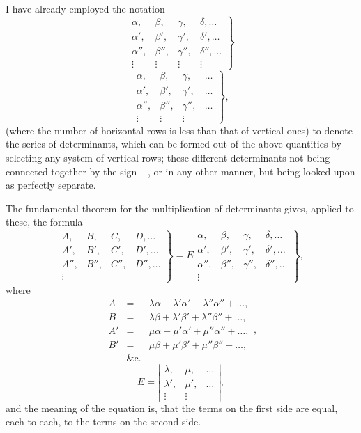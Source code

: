 \documentclass[11pt,a4paper]{article}
\theoremstyle{plain}
\theoremstyle{definition}
\theoremstyle{remark}
\begin{document}
\newpage

I have already employed the notation
\[
\left.
\begin{array}{cccc}
\alpha,&\beta,&\gamma,&\delta,\ldots \\
\alpha',&\beta',&\gamma',&\delta',\ldots \\
\alpha'',&\beta'',&\gamma'',&\delta'',\ldots \\
\vdots&\vdots&\vdots&\vdots
\end{array}
\right\}
\tag{1}
\]
\[
\left.
\begin{array}{cccc}
\alpha,&\beta,&\gamma,&\ldots \\
\alpha',&\beta',&\gamma',&\ldots \\
\alpha'',&\beta'',&\gamma'',&\ldots \\
\vdots&\vdots&\vdots
\end{array}
\right\}
\tag{2},
\]
(where the number of horizontal rows is less than that of vertical ones) to denote
the series of determinants, which can be formed out of the above quantities by selecting any system of vertical
rows; these different determinants not being connected together by the sign $+$, or in
any other manner, but being looked upon as perfectly separate.

The fundamental theorem for the multiplication of determinants gives, applied to
these, the formula
\[
\left.
\begin{array}{cccc}
A,&B,&C,&D,\ldots \\
A',&B',&C',&D',\ldots \\
A'',&B'',&C'',&D'',\ldots \\
\vdots
\end{array}
\right\}
= E
\left.
\begin{array}{cccc}
\alpha,&\beta,&\gamma,&\delta,\ldots \\
\alpha',&\beta',&\gamma',&\delta',\ldots \\
\alpha'',&\beta'',&\gamma'',&\delta'',\ldots \\
\vdots
\end{array}
\right\}
\tag{3},
\]
where
\[
\begin{array}{rcl}
A &=& \lambda\alpha+\lambda'\alpha'+\lambda''\alpha''+\ldots, \\
B &=& \lambda\beta+\lambda'\beta'+\lambda''\beta''+\ldots, \\
A' &=& \mu\alpha+\mu'\alpha'+\mu''\alpha''+\ldots, \\
B' &=& \mu\beta+\mu'\beta'+\mu''\beta''+\ldots, \\
&\&\text{c.}
\end{array}
\tag{4},
\]
\[
E = \left|
\begin{array}{cccc}
\lambda,&\mu,&\ldots \\
\lambda',&\mu',&\ldots \\
\vdots&\vdots
\end{array}
\right|
\tag{5},
\]
and the meaning of the equation is, that the terms on the first side are equal, each
to each, to the terms on the second side.
\end{document}
